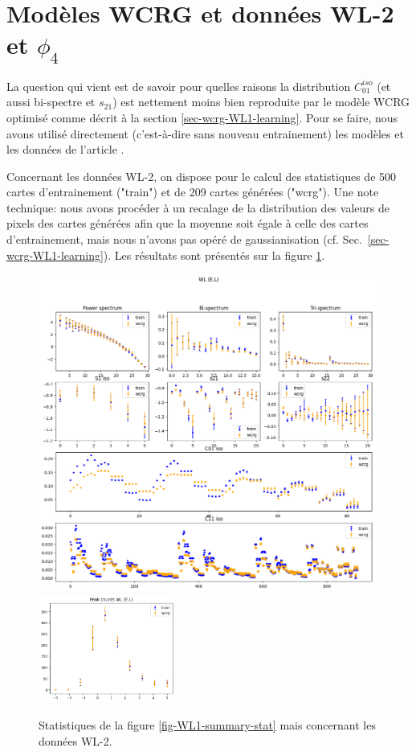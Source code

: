 \documentclass[12pt,twoside]{article}
\begin{document}
\section{Modèles WCRG et données WL-2 et $\phi_4$}
%
La question qui vient est de savoir pour quelles raisons la distribution $C_{01}^{iso}$ (et aussi bi-spectre et $s_{21}$) est nettement moins bien reproduite par le modèle WCRG optimisé comme décrit à la section \ref{sec-wcrg-WL1-learning}. Pour se faire, nous avons utilisé directement (c'est-à-dire sans nouveau entrainement) les modèles et les données de l'article \citep{2023arXiv230600181G}.

Concernant les données WL-2, on dispose pour le calcul des statistiques de 500 cartes d'entrainement ("train") et de 209 cartes générées ("wcrg"). Une note technique: nous avons procéder à un recalage de la distribution des valeurs de pixels des cartes générées afin que la moyenne soit égale à celle des cartes d'entrainement, mais nous n'avons pas opéré de gaussianisation (cf. Sec.~\ref{sec-wcrg-WL1-learning}). Les résultats sont présentés sur la figure \ref{fig-WL2-summary-stat}.
\begin{figure}
\centering
\includegraphics[width=0.99\textwidth]{fig-WL2-summary-stat.png}\\
\includegraphics[width=0.4\textwidth]{fig-WL2-peak-count.png}
\caption{Statistiques de la figure \ref{fig-WL1-summary-stat} mais concernant les données WL-2.}
\label{fig-WL2-summary-stat}
\end{figure}
\end{document}

